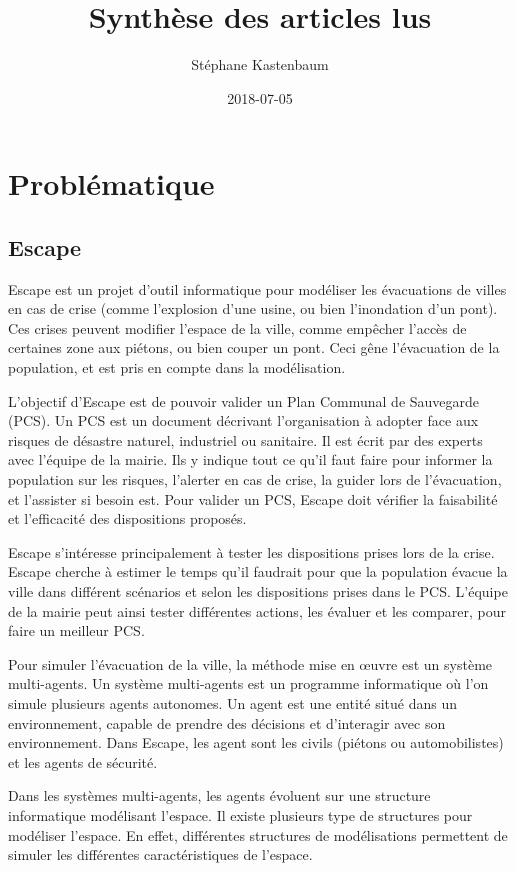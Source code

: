 \documentclass[a4paper]{article}
\title{Synthèse des articles lus}
\author{Stéphane Kastenbaum}
\date{2018-07-05}
\begin{document}
\maketitle

\section{Problématique}

\subsection{Escape}

Escape est un projet d'outil informatique pour modéliser les évacuations de
villes en cas de crise (comme l'explosion d'une usine, ou bien l'inondation d'un
pont). Ces crises peuvent modifier l'espace de la ville, comme empêcher l'accès
de certaines zone aux piétons, ou bien couper un pont. Ceci gêne l'évacuation de
la population, et est pris en compte dans la modélisation.

L'objectif d'Escape est de pouvoir valider un Plan Communal de Sauvegarde (PCS).
Un PCS est un document décrivant l'organisation à adopter face aux risques de
désastre naturel, industriel ou sanitaire. Il est écrit par des experts avec
l'équipe de la mairie. Ils y indique tout ce qu'il faut faire pour informer la
population sur les risques, l'alerter en cas de crise, la guider lors de
l'évacuation, et l'assister si besoin est.  Pour valider un PCS, Escape doit
vérifier la faisabilité et l'efficacité des dispositions proposés.

Escape s'intéresse principalement à tester les dispositions prises lors de la
crise. Escape cherche à estimer le temps qu'il faudrait pour que la population
évacue la ville dans différent scénarios et selon les dispositions prises dans
le PCS. L'équipe de la mairie peut ainsi tester différentes actions, les évaluer
et les comparer, pour faire un meilleur PCS.

Pour simuler l'évacuation de la ville, la méthode mise en œuvre est un système
multi-agents. Un système multi-agents est un programme informatique où l'on
simule plusieurs agents autonomes. Un agent est une entité situé dans un
environnement, capable de prendre des décisions et d'interagir avec son
environnement. Dans Escape, les agent sont les civils (piétons ou
automobilistes) et les agents de sécurité.

Dans les systèmes multi-agents, les agents évoluent sur une structure
informatique modélisant l'espace. Il existe plusieurs type de structures pour
modéliser l'espace. En effet, différentes structures de modélisations permettent
de simuler les différentes caractéristiques de l'espace.
\end{document}
